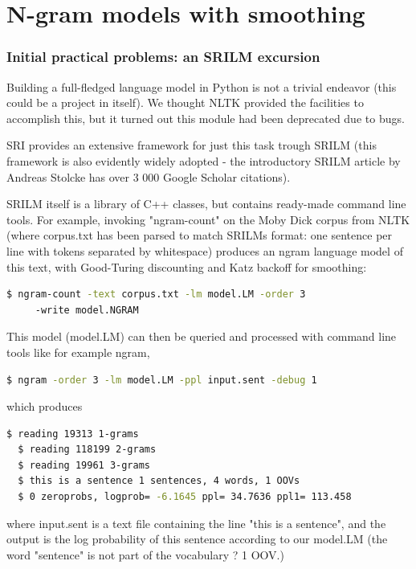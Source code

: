 \documentclass[a4paper,12pt]{article}
\begin{document}
\section{N-gram models with smoothing}

\subsubsection{Initial practical problems: an SRILM excursion}
Building a full-fledged language model in Python is not a trivial endeavor (this could be a project in itself). We thought NLTK provided the facilities to accomplish this, but it turned out this module had been deprecated due to bugs. 

SRI provides an extensive framework for just this task trough SRILM (this framework is also evidently widely adopted - the introductory SRILM article by Andreas Stolcke has over 3 000 Google Scholar citations). 

SRILM itself is a library of C++ classes, but contains ready-made command line tools. For example, invoking "ngram-count" on the Moby Dick corpus from NLTK (where corpus.txt has been parsed to match SRILMs format: one sentence per line with tokens separated by whitespace) produces an ngram language model of this text, with Good-Turing discounting and Katz backoff for smoothing:

\begin{lstlisting}[language=bash]
  $ ngram-count -text corpus.txt -lm model.LM -order 3
     -write model.NGRAM
\end{lstlisting}


This model (model.LM) can then be queried and processed with command line tools like for example ngram,

\begin{lstlisting}[language=bash]
  $ ngram -order 3 -lm model.LM -ppl input.sent -debug 1 
\end{lstlisting}


which produces

\begin{lstlisting}[language=bash]
  $ reading 19313 1-grams 
  $ reading 118199 2-grams
  $ reading 19961 3-grams
  $ this is a sentence 1 sentences, 4 words, 1 OOVs
  $ 0 zeroprobs, logprob= -6.1645 ppl= 34.7636 ppl1= 113.458
\end{lstlisting}


where input.sent is a text file containing the line "this is a sentence", and the output is the log probability of this sentence according to our model.LM (the word "sentence" is not part of the vocabulary ? 1 OOV.)
\end{document}
